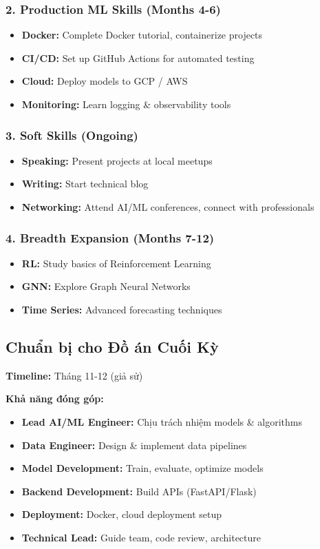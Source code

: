 \documentclass[12pt,a4paper]{article}
\begin{document}
\subsubsection{2. Production ML Skills (Months 4-6)}
\begin{itemize}
    \item \textbf{Docker:} Complete Docker tutorial, containerize projects
    \item \textbf{CI/CD:} Set up GitHub Actions for automated testing
    \item \textbf{Cloud:} Deploy models to GCP / AWS
    \item \textbf{Monitoring:} Learn logging \& observability tools
\end{itemize}

\subsubsection{3. Soft Skills (Ongoing)}
\begin{itemize}
    \item \textbf{Speaking:} Present projects at local meetups
    \item \textbf{Writing:} Start technical blog
    \item \textbf{Networking:} Attend AI/ML conferences, connect with professionals
\end{itemize}

\subsubsection{4. Breadth Expansion (Months 7-12)}
\begin{itemize}
    \item \textbf{RL:} Study basics of Reinforcement Learning
    \item \textbf{GNN:} Explore Graph Neural Networks
    \item \textbf{Time Series:} Advanced forecasting techniques
\end{itemize}

\subsection{Chuẩn bị cho Đồ án Cuối Kỳ}

\textbf{Timeline:} Tháng 11-12 (giả sử)

\textbf{Khả năng đóng góp:}
\begin{itemize}
    \item \textbf{Lead AI/ML Engineer:} Chịu trách nhiệm models \& algorithms
    \item \textbf{Data Engineer:} Design \& implement data pipelines
    \item \textbf{Model Development:} Train, evaluate, optimize models
    \item \textbf{Backend Development:} Build APIs (FastAPI/Flask)
    \item \textbf{Deployment:} Docker, cloud deployment setup
    \item \textbf{Technical Lead:} Guide team, code review, architecture
\end{itemize}
\end{document}
